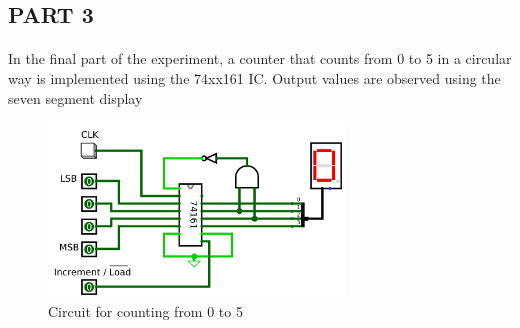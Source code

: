 \documentclass[pdftex,12pt,a4paper]{article}
\begin{document}
\begin{flushleft}
 
 
\subsection{PART 3}

\paragraph{}
In the final part of the experiment,  a counter that counts from 0 to 5 in a circular way is implemented using the 74xx161 IC. Output values are observed using the seven segment display

 \newpage
\begin{figure}[h]
	\centering
	\includegraphics[width=0.7\textwidth]{part3.png}	
	\caption{Circuit for counting from 0 to 5}
	\label{circ:part3}
\end{figure}
\end{flushleft}
\end{document}
